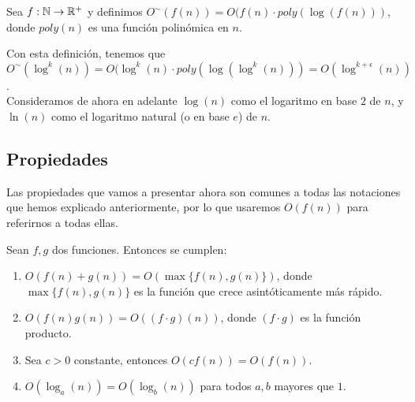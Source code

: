 \begin{definicion}
	Sea $f:\mathbb{N} \to \mathbb{R}^+$ y definimos $O^\sim(f(n)) = O(f(n) \cdot poly(\log(f(n)))$, donde $poly(n)$ es una función polinómica en $n$.
\end{definicion}

Con esta definición, tenemos que $O^\sim(\log^k(n)) = O(\log^k(n) \cdot poly(\log(\log^k(n))) = O(\log^{k+\epsilon}(n))$.\\

Consideramos de ahora en adelante $\log(n)$ como el logaritmo en base $2$ de $n$, y $\ln(n)$ como el logaritmo natural (o en base $e$) de $n$.

\subsection{Propiedades}

Las propiedades que vamos a presentar ahora son comunes a todas las notaciones que hemos explicado anteriormente, por lo que usaremos $O(f(n))$ para referirnos a todas ellas.

\begin{proposicion}
	Sean $f, g$ dos funciones. Entonces se cumplen:
	
	\begin{enumerate}
		\item $O(f(n) + g(n)) = O(\max\{f(n), g(n)\})$, donde $\max\{f(n), g(n)\}$ es la función que crece asintóticamente más rápido.
		
		\item $O(f(n)g(n)) = O((f\cdot g)(n))$, donde $(f\cdot g)$ es la función producto.
		
		\item Sea $c > 0$ constante, entonces $O(cf(n)) = O(f(n))$.
		
		\item $O(\log_a(n)) = O(\log_b(n))$ para todos $a, b$ mayores que $1$.
	\end{enumerate}
\end{proposicion}

\endinput
